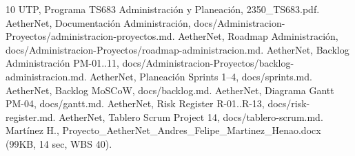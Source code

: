 \documentclass[conference]{IEEEtran}
\begin{document}
\begin{thebibliography}{10}
 UTP, Programa TS683 Administración y Planeación, 2350\_TS683.pdf.
 AetherNet, Documentación Administración, docs/Administracion-Proyectos/administracion-proyectos.md.
 AetherNet, Roadmap Administración, docs/Administracion-Proyectos/roadmap-administracion.md.
 AetherNet, Backlog Administración PM-01..11, docs/Administracion-Proyectos/backlog-administracion.md.
 AetherNet, Planeación Sprints 1--4, docs/sprints.md.
 AetherNet, Backlog MoSCoW, docs/backlog.md.
 AetherNet, Diagrama Gantt PM-04, docs/gantt.md.
 AetherNet, Risk Register R-01..R-13, docs/risk-register.md.
 AetherNet, Tablero Scrum Project 14, docs/tablero-scrum.md.
 Martínez H., Proyecto\_AetherNet\_\-Andres\_Felipe\_\-Martinez\_Henao.docx (99KB, 14 sec, WBS 40).
\end{thebibliography}
\end{document}
